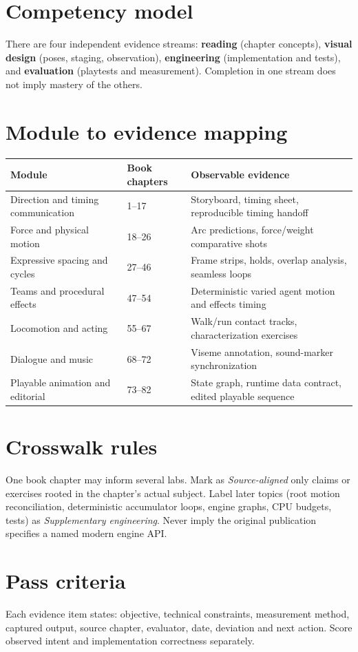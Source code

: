 \documentclass[10pt,letterpaper]{article}
\begin{document}
\makedoctitle
\makedocsummary
\tableofcontents\clearpage
\section{Competency model}
There are four independent evidence streams: \textbf{reading} (chapter concepts), \textbf{visual design} (poses, staging, observation), \textbf{engineering} (implementation and tests), and \textbf{evaluation} (playtests and measurement). Completion in one stream does not imply mastery of the others.
\section{Module to evidence mapping}
\begin{longtable}{p{.27\linewidth}p{.19\linewidth}p{.38\linewidth}}
\textbf{Module}&\textbf{Book chapters}&\textbf{Observable evidence}\\\hline
Direction and timing communication&1--17&Storyboard, timing sheet, reproducible timing handoff\\
Force and physical motion&18--26&Arc predictions, force/weight comparative shots\\
Expressive spacing and cycles&27--46&Frame strips, holds, overlap analysis, seamless loops\\
Teams and procedural effects&47--54&Deterministic varied agent motion and effects timing\\
Locomotion and acting&55--67&Walk/run contact tracks, characterization exercises\\
Dialogue and music&68--72&Viseme annotation, sound-marker synchronization\\
Playable animation and editorial&73--82&State graph, runtime data contract, edited playable sequence\\
\end{longtable}
\section{Crosswalk rules}
One book chapter may inform several labs. Mark as \emph{Source-aligned} only claims or exercises rooted in the chapter's actual subject. Label later topics (root motion reconciliation, deterministic accumulator loops, engine graphs, CPU budgets, tests) as \emph{Supplementary engineering}. Never imply the original publication specifies a named modern engine API.
\section{Pass criteria}
Each evidence item states: objective, technical constraints, measurement method, captured output, source chapter, evaluator, date, deviation and next action. Score observed intent and implementation correctness separately.
\end{document}
